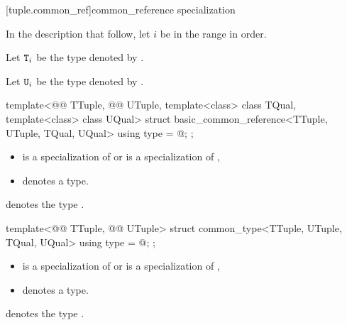 \documentclass{wg21}
\begin{document}
\begin{addedblock}
[tuple.common_ref]{common_reference specialization}

\begin{addedblock}
    In the description that follow, let $i$ be in the range
     in order.

    Let $\texttt{T}_i$ be the type denoted by .

    Let $\texttt{U}_i$ be the type denoted by .
\end{addedblock}

\begin{itemdecl}
    template<@@ TTuple, @@ UTuple, template<class> class TQual, template<class> class UQual>
    struct basic_common_reference<TTuple, UTuple, TQual, UQual> {
        using type = @\seebelow@;
    };
\end{itemdecl}

\begin{itemdescr}
    \constraints
    \begin{itemize}
        \item {} is a specialization of  or  is a specialization of ,
        \item {} denotes a type.
    \end{itemize}

     denotes the type .

\end{itemdescr}

\begin{itemdecl}
    template<@@ TTuple, @@ UTuple>
    struct common_type<TTuple, UTuple, TQual, UQual> {
        using type = @\seebelow@;
    };
\end{itemdecl}

\begin{itemdescr}
    \constraints
    \begin{itemize}
        \item {} is a specialization of  or  is a specialization of ,
        \item {} denotes a type.
    \end{itemize}

     denotes the type .

\end{itemdescr}
\end{addedblock}
\end{document}
